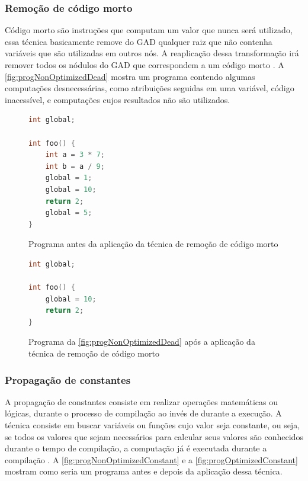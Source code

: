 \subsubsection{Remoção de código morto}
Código morto são instruções que computam um valor que nunca será utilizado, essa técnica basicamente remove do GAD qualquer raiz que não contenha variáveis que são utilizadas em outros nós. A reaplicação dessa transformação irá remover todos os nódulos do GAD que correspondem a um código morto \cite{Aho:1986}. A \autoref{fig:progNonOptimizedDead} mostra um programa contendo algumas computações desnecessárias, como atribuições seguidas em uma variável, código inacessível, e computações cujos resultados não são utilizados.

\begin{figure}[H]
	\caption{\label{fig:progNonOptimizedDead} Programa antes da aplicação da técnica de remoção de código morto }
	\begin{center}
    \begin{minipage}{0.6\textwidth}
          \begin{lstlisting}[language=C]
int global;  

int foo() {
    int a = 3 * 7;
    int b = a / 9;
    global = 1;
    global = 10;
    return 2;
    global = 5;
}
	\end{lstlisting}
    \end{minipage}
	\end{center}
  \end{figure}

  \begin{figure}[H]
	\caption{\label{fig:progOptimizedDead} Programa da \autoref{fig:progNonOptimizedDead} após a aplicação da técnica de remoção de código morto }
	\begin{center}
    \begin{minipage}{0.6\textwidth}
    \begin{lstlisting}[language=C]       
int global;  

int foo() {       
    global = 10;
    return 2;
}
	\end{lstlisting}
    \end{minipage}
	\end{center}
\end{figure}

\subsubsection{Propagação de constantes}
A propagação de constantes consiste em realizar operações matemáticas ou lógicas, durante o processo de compilação ao invés de durante a execução. A técnica consiste em buscar variáveis ou funções cujo valor seja constante, ou seja, se todos os valores que sejam necessários para calcular seus valores são conhecidos durante o tempo de compilação, a computação já é executada durante a compilação \cite{Aho:1986}. A \autoref{fig:progNonOptimizedConstant} e a \autoref {fig:progOptimizedConstant} mostram como seria um programa antes e depois da aplicação dessa técnica.


